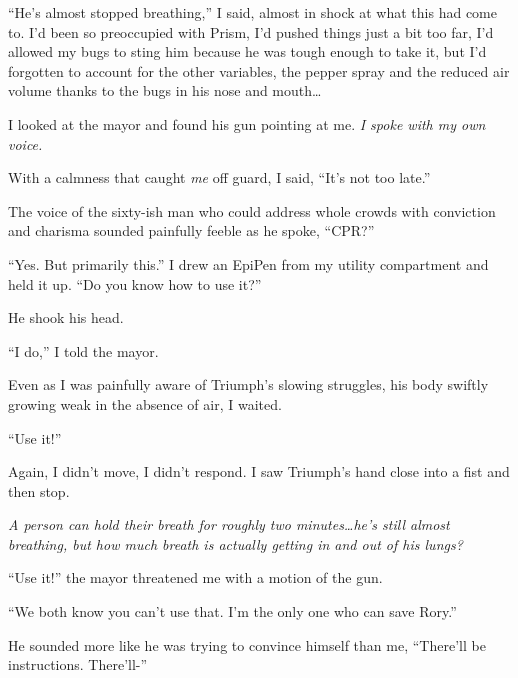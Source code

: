 ``He's almost stopped breathing,'' I said, almost in shock at what this had come to.  I'd been so preoccupied with Prism, I'd pushed things just a bit too far, I'd allowed my bugs to sting him because he was tough enough to take it, but I'd forgotten to account for the other variables, the pepper spray and the reduced air volume thanks to the bugs in his nose and mouth\ldots



I looked at the mayor and found his gun pointing at me.  \emph{I spoke with my own voice.}



With a calmness that caught \emph{me} off guard, I said, ``It's not too late.''



The voice of the sixty-ish man who could address whole crowds with conviction and charisma sounded painfully feeble as he spoke, ``CPR?''



``Yes.  But primarily this.''  I drew an EpiPen from my utility compartment and held it up.  ``Do you know how to use it?''



He shook his head.



``I do,'' I told the mayor.



Even as I was painfully aware of Triumph's slowing struggles, his body swiftly growing weak in the absence of air, I waited.



``Use it!''



Again, I didn't move, I didn't respond.  I saw Triumph's hand close into a fist and then stop.



\emph{A person can hold their breath for roughly two minutes\ldots he's still almost breathing, but how much breath is actually getting in and out of his lungs?}



``Use it!'' the mayor threatened me with a motion of the gun.



``We both know you can't use that.  I'm the only one who can save Rory.''



He sounded more like he was trying to convince himself than me, ``There'll be instructions.  There'll-''



